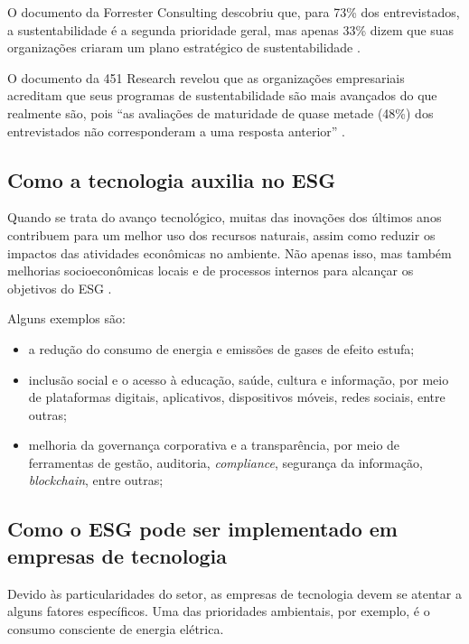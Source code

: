 \documentclass[12pt]{article}
\begin{document}
	O documento da Forrester Consulting descobriu que, para 73\% dos entrevistados, a sustentabilidade é a segunda prioridade geral, mas apenas 33\% dizem que suas organizações criaram um plano estratégico de sustentabilidade \cite{paceteESGPrioridadePara2022}.
	
	O documento da 451 Research revelou que as organizações empresariais acreditam que seus programas de sustentabilidade são mais avançados do que realmente são, pois “as avaliações de maturidade de quase metade (48\%) dos entrevistados não corresponderam a uma resposta anterior” \cite{paceteESGPrioridadePara2022}.
	
	\subsection*{Como a tecnologia auxilia no ESG}
	
	Quando se trata do avanço tecnológico, muitas das inovações dos últimos anos contribuem para um melhor uso dos recursos naturais, assim como reduzir os impactos das atividades econômicas no ambiente. Não apenas isso, mas também melhorias socioeconômicas locais e de processos internos para alcançar os objetivos do ESG \cite{cabralPraticasESGAplicadas2023}.
	
	Alguns exemplos são:
	
	\begin{itemize}
		\item a redução do consumo de energia e emissões de gases de efeito estufa;
		\item inclusão social e o acesso à educação, saúde, cultura e informação, por meio de plataformas digitais, aplicativos, dispositivos móveis, redes sociais, entre outras;
		\item melhoria da governança corporativa e a transparência, por meio de ferramentas de gestão, auditoria, \emph{compliance}, segurança da informação, \emph{blockchain}, entre outras;
	\end{itemize}
	
	\subsection*{Como o ESG pode ser implementado em empresas de tecnologia}
	
	Devido às particularidades do setor, as empresas de tecnologia devem se atentar a alguns fatores específicos. Uma das prioridades ambientais, por exemplo, é o consumo consciente de energia elétrica.
	
\end{document}
